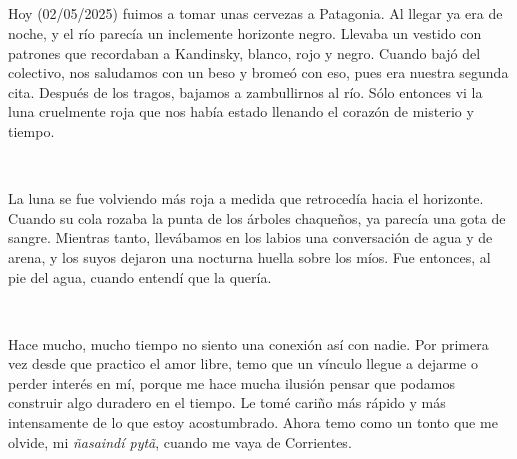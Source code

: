 \documentclass[a4paper, 12pt]{article}
\begin{document}
\subsection{}

Hoy (02/05/2025) fuimos a tomar unas cervezas a Patagonia. Al llegar ya era de
noche, y el río parecía un inclemente horizonte negro. Llevaba un vestido con
patrones que recordaban a Kandinsky, blanco, rojo y negro. Cuando bajó del 
colectivo, nos saludamos con un beso y bromeó con eso, pues era nuestra
segunda cita. Después de los tragos, bajamos a zambullirnos al río. Sólo 
entonces vi la luna cruelmente roja que nos había estado llenando el corazón de
misterio y tiempo.

~

La luna se fue volviendo más roja a medida que retrocedía hacia el horizonte.
Cuando su cola rozaba la punta de los árboles chaqueños, ya parecía una gota de
sangre. Mientras tanto, llevábamos en los labios una conversación de agua y de
arena, y los suyos dejaron una nocturna huella sobre los míos. Fue entonces,
al pie del agua, cuando entendí que la quería.

~ 

Hace mucho, mucho tiempo no siento una conexión así con nadie. Por primera vez
desde que practico el amor libre, temo que un vínculo llegue a dejarme o perder
interés en mí, porque me hace mucha ilusión pensar que podamos construir algo
duradero en el tiempo. Le tomé cariño más rápido y más intensamente de lo que
estoy acostumbrado. Ahora temo como un tonto que me olvide, mi \textit{ñasaindí pytã},
cuando me vaya de Corrientes.
\end{document}
